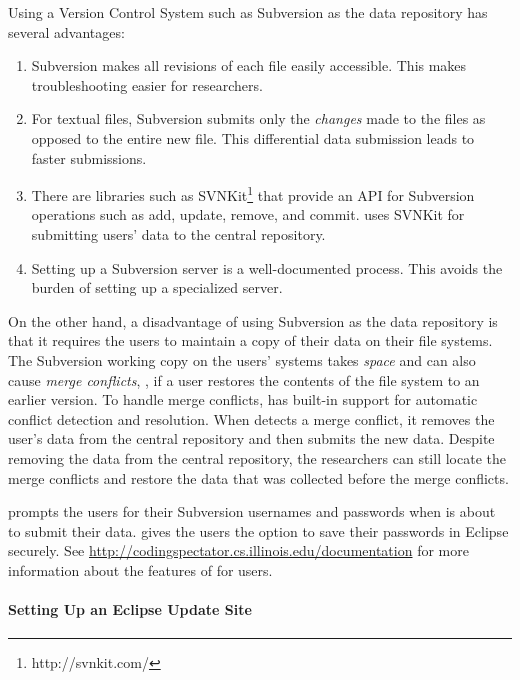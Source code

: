 Using a Version Control System such as Subversion as the data repository has
several advantages:

\begin{enumerate}
%
\item Subversion makes all revisions of each file easily accessible. This makes
  troubleshooting easier for researchers.
%
\item For textual files, Subversion submits only the \emph{changes} made to the
  files as opposed to the entire new file. This differential data submission
  leads to faster submissions.
%
\item There are libraries such as SVNKit\footnote{http://svnkit.com/} that
  provide an API for Subversion operations such as add, update, remove, and
  commit. \CodingSpectator{} uses SVNKit for submitting users' data to the
  central repository.
%
\item Setting up a Subversion server is a well-documented process. This avoids
  the burden of setting up a specialized server.
%
\end{enumerate}

On the other hand, a disadvantage of using Subversion as the data repository is
that it requires the users to maintain a copy of their data on their file
systems. The Subversion working copy on the users' systems takes \emph{space}
and can also cause \emph{merge conflicts}, \eg, if a user restores the contents
of the file system to an earlier version. To handle merge conflicts,
\CodingSpectator{} has built-in support for automatic conflict detection and
resolution. When \CodingSpectator{} detects a merge conflict, it removes the
user's data from the central repository and then submits the new data. Despite
removing the data from the central repository, the researchers can still locate
the merge conflicts and restore the data that was collected before the merge
conflicts.

\CodingSpectator{} prompts the users for their Subversion usernames and
passwords when \CodingSpectator{} is about to submit their data.
\CodingSpectator{} gives the users the option to save their passwords in Eclipse
securely. See \url{http://codingspectator.cs.illinois.edu/documentation} for
more information about the features of \CodingSpectator{} for users.

\paragraph{Setting Up an Eclipse Update Site}

